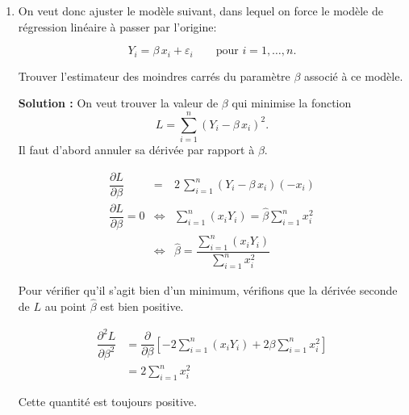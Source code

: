 \documentclass[letter, 11pt]{article}
\newcommand{\prof}[1]{\begin{professeur}\color{blue} {\bf Solution :} #1 \end{professeur}}
\begin{document}
\begin{enumerate}[leftmargin=*, wide, label=\bf Exercice \arabic*:]
{\begin{enumerate}[label={\bf \alph*)}]
\item    L'ordonnée à l'origine indique que dans la population des filles de $18$ ans mesurant $0$ cm, le poids moyen est  de $-234.12$ kg. Ce n'est pas une valeur très intéressante à interpréter ici. \\

 La pente indique quant à elle qu'une hausse de la taille de $1$ cm chez une fille de $18$ ans est associée à une augmentation du poids moyen de 1.75 kg. \\

\item L'estimation de la variance des termes d'erreur est
    $$
     \hat\sigma^2=\frac{\sum_{i=1}^n \hat{\varepsilon}_i^2}{n-2} =  \frac{\sum_{i=1}^n(Y_i-\hat{Y}_i)^2}{n-2}
    $$
     qui vaut ici 41.33.
     
    \end{enumerate}}

\item On veut donc ajuster le modèle suivant, dans lequel on force le modèle de régression linéaire à passer par l'origine:
    
    $$Y_i = \beta\,x_i + \varepsilon_i\qquad\text{pour } i=1,\dots,n.$$
    
    Trouver l'estimateur des moindres carrés du paramètre $\beta$ associé à ce modèle.
    
\prof{On veut trouver la valeur de $\beta$ qui minimise la fonction $$L=\sum\limits_{i=1}^n (Y_i-\beta\,x_i)^2.$$ Il faut d'abord annuler sa dérivée par rapport à $\beta$.


$$\begin{array}{rcl}
\dfrac{\partial L}{\partial\beta}&=& 2\,\sum\limits_{i=1}^n (Y_i-\beta\,x_i)(-x_i)\\[6mm]
\dfrac{\partial L}{\partial\beta}=0&\Leftrightarrow &\sum\limits_{i=1}^n (x_iY_i)= \hat\beta \sum\limits_{i=1}^n  x_i^2\\[6mm]
&\Leftrightarrow &\hat\beta = \dfrac{\sum\limits_{i=1}^n (x_iY_i)}{\sum\limits_{i=1}^n  x_i^2}
\end{array}$$

Pour vérifier qu'il s'agit bien d'un minimum, vérifions que la dérivée seconde de $L$ au point $\hat\beta$ est bien positive.

$$\begin{array}{rl}
\dfrac{\partial^2 L}{\partial\beta^2}&= \dfrac{\partial }{\partial\beta}\left[-2\sum\limits_{i=1}^n (x_iY_i) + 2\beta \sum\limits_{i=1}^n x_i^2\right]\\[6mm]
&= 2\sum\limits_{i=1}^n  x_i^2
\end{array}$$

Cette quantité est toujours positive.}

\end{enumerate}
\end{document}
